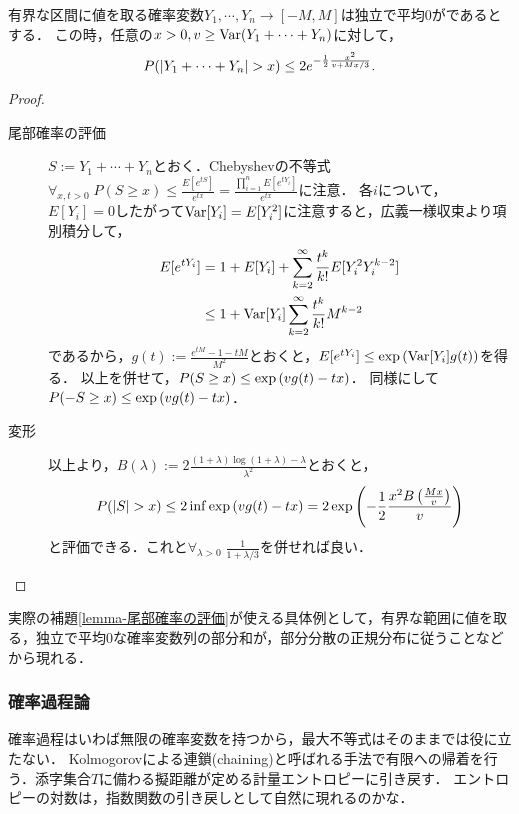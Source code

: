 \documentclass[uplatex,dvipdfmx]{jsreport}
\begin{document}
\begin{lemma}[Bernstein]\label{lemma-Bernstein}
    有界な区間に値を取る確率変数$Y_1,\cdots,Y_n\to[-M,M]$は独立で平均$0$がであるとする．
    この時，任意の$x>0,v\ge\mathrm{Var}(Y_1+\cdots+Y_n)$に対して，
    \[P(\lvert Y_1+\cdots+Y_n\rvert>x)\le 2e^{-\frac{1}{2}\frac{x^2}{v+Mx/3}}.\]
\end{lemma}
\begin{proof}\mbox{}
    \begin{description}
        \item[尾部確率の評価] 
        $S:=Y_1+\cdots+Y_n$とおく．Chebyshevの不等式$\forall_{x,t>0}\;P(S\ge x)\le\frac{E[e^{tS}]}{e^{tx}}=\frac{\prod_{i=1}^nE[e^{tY_i}]}{e^{tx}}$に注意．
        各$i$について，$E[Y_i]=0$したがって$\mathrm{Var}[Y_i]=E[Y_i^2]$に注意すると，広義一様収束より項別積分して，
        \begin{align*}
            E[e^{tY_i}]&=1+E[Y_i]+\sum^\infty_{k=2}\frac{t^k}{k!}E[Y^2_iY^{k-2}_i]\\
            &\le 1+\mathrm{Var}[Y_i]\sum^\infty_{k=2}\frac{t^k}{k!}M^{k-2}
        \end{align*}
        であるから，$g(t):=\frac{e^{tM}-1-tM}{M^2}$とおくと，$E[e^{tY_i}]\le\exp\left(\mathrm{Var}[Y_i]g(t)\right)$を得る．
        以上を併せて，$P(S\ge x)\le\exp\left(vg(t)-tx\right)$．
        同様にして$P(-S\ge x)\le\exp\left(vg(t)-tx\right)$．
        \item[変形]
        以上より，$B(\lambda):=2\frac{(1+\lambda)\log(1+\lambda)-\lambda}{\lambda^2}$とおくと，
        \[P(\lvert S\rvert>x)\le 2\inf\exp\left(vg(t)-tx\right)=2\exp\left(-\frac{1}{2}\frac{x^2B\left(\frac{Mx}{v}\right)}{v}\right)\]
        と評価できる．これと$\forall_{\lambda>0}\;\frac{1}{1+\lambda/3}$を併せれば良い．
    \end{description}
\end{proof}
\begin{remarks}
    実際の補題\ref{lemma-尾部確率の評価}が使える具体例として，有界な範囲に値を取る，独立で平均$0$な確率変数列の部分和が，部分分散の正規分布に従うことなどから現れる．
\end{remarks}

\subsubsection{確率過程論}

\begin{tcolorbox}[colframe=ForestGreen, colback=ForestGreen!10!white,breakable,colbacktitle=ForestGreen!40!white,coltitle=black,fonttitle=\bfseries\sffamily,
title=一般最大不等式の導出]
    確率過程はいわば無限の確率変数を持つから，最大不等式はそのままでは役に立たない．
    Kolmogorovによる連鎖(chaining)と呼ばれる手法で有限への帰着を行う．添字集合$T$に備わる擬距離が定める計量エントロピーに引き戻す．
    エントロピーの対数は，指数関数の引き戻しとして自然に現れるのかな．
\end{tcolorbox}
\end{document}

